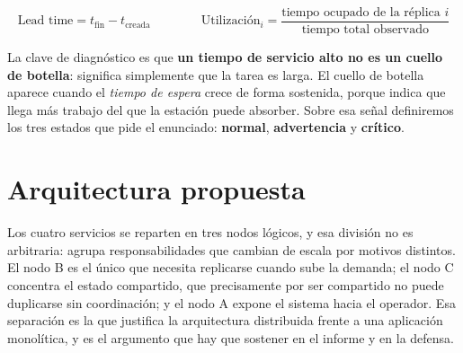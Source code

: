 \documentclass[11pt,a4paper]{article}
\begin{document}
\vspace{-4pt}
\[
\text{Lead time} = t_{\text{fin}} - t_{\text{creada}}
\qquad\qquad
\text{Utilización}_i = \frac{\text{tiempo ocupado de la réplica } i}{\text{tiempo total observado}}
\]

La clave de diagnóstico es que \textbf{un tiempo de servicio alto no es un cuello de botella}: significa simplemente que la tarea es larga. El cuello de botella aparece cuando el \emph{tiempo de espera} crece de forma sostenida, porque indica que llega más trabajo del que la estación puede absorber. Sobre esa señal definiremos los tres estados que pide el enunciado: \textbf{normal}, \textbf{advertencia} y \textbf{crítico}.

\section{Arquitectura propuesta}

Los cuatro servicios se reparten en tres nodos lógicos, y esa división no es arbitraria: agrupa responsabilidades que cambian de escala por motivos distintos. El nodo B es el único que necesita replicarse cuando sube la demanda; el nodo C concentra el estado compartido, que precisamente por ser compartido no puede duplicarse sin coordinación; y el nodo A expone el sistema hacia el operador. Esa separación es la que justifica la arquitectura distribuida frente a una aplicación monolítica, y es el argumento que hay que sostener en el informe y en la defensa.
\end{document}
